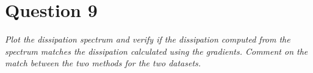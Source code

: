 \section*{Question 9}
\textit{Plot the dissipation spectrum and verify if the dissipation computed from the spectrum matches the dissipation calculated using the gradients. Comment on the match between the two methods for the two datasets.}